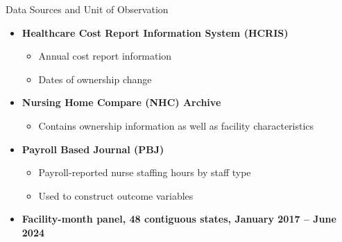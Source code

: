 \documentclass{beamer}
\begin{document}
\begin{frame}[t]{Data Sources and Unit of Observation}

\begin{itemize}
	
	\setlength{\itemsep}{0.8em}
	\item \textbf{Healthcare Cost Report Information System (HCRIS)}
	
	\begin{itemize}
		\setlength{\itemsep}{0.2em}
		\item Annual cost report information
		\item Dates of ownership change
	\end{itemize}
	
	\item \textbf{Nursing Home Compare (NHC) Archive}
	
	\begin{itemize}
		\setlength{\itemsep}{0.2em}
		\item Contains ownership information as well as facility characteristics
	\end{itemize}
	
	\item \textbf{Payroll Based Journal (PBJ)}
	
	\begin{itemize}
		\setlength{\itemsep}{0.2em}
		\item Payroll-reported nurse staffing hours by staff type
		\item Used to construct outcome variables
	\end{itemize}

	\item \textbf{Facility-month panel, 48 contiguous states, January 2017 -- June 2024}

\end{itemize}
\end{frame}
\end{document}
